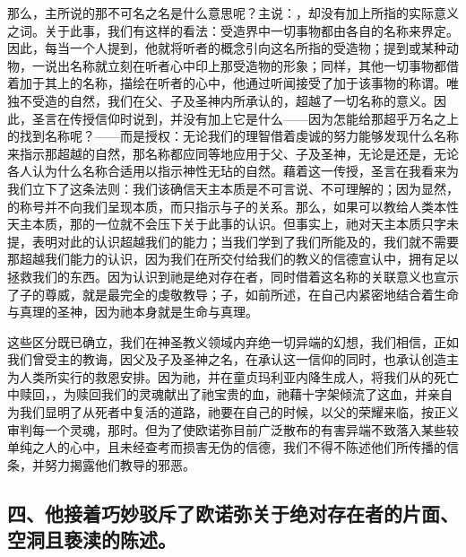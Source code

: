 那么，主所说的那不可名之名是什么意思呢？主说：，却没有加上所指的实际意义之词。关于此事，我们有这样的看法：受造界中一切事物都由各自的名称来界定。因此，每当一个人提到，他就将听者的概念引向这名所指的受造物；提到或某种动物，一说出名称就立刻在听者心中印上那受造物的形象；同样，其他一切事物都借着加于其上的名称，描绘在听者的心中，他通过听闻接受了加于该事物的称谓。唯独不受造的自然，我们在父、子及圣神内所承认的，超越了一切名称的意义。因此，圣言在传授信仰时说到，并没有加上它是什么——因为怎能给那超乎万名之上的找到名称呢？——而是授权：无论我们的理智借着虔诚的努力能够发现什么名称来指示那超越的自然，那名称都应同等地应用于父、子及圣神，无论是还是，无论各人认为什么名称合适用以指示神性无玷的自然。藉着这一传授，圣言在我看来为我们立下了这条法则：我们该确信天主本质是不可言说、不可理解的；因为显然，的称号并不向我们呈现本质，而只指示与子的关系。那么，如果可以教给人类本性天主本质，那的一位就不会压下关于此事的认识。但事实上，祂对天主本质只字未提，表明对此的认识超越我们的能力；当我们学到了我们所能及的，我们就不需要那超越我们能力的认识，因为我们在所交付给我们的教义的信德宣认中，拥有足以拯救我们的东西。因为认识到祂是绝对存在者，同时借着这名称的关联意义也宣示了子的尊威，就是最完全的虔敬教导；子，如前所述，在自己内紧密地结合着生命与真理的圣神，因为祂本身就是生命与真理。\par

这些区分既已确立，我们在神圣教义领域内弃绝一切异端的幻想，我们相信，正如我们曾受主的教诲，因父及子及圣神之名，在承认这一信仰的同时，也承认创造主为人类所实行的救恩安排。因为祂，并在童贞玛利亚内降生成人，将我们从的死亡中赎回，，为赎回我们的灵魂献出了祂宝贵的血，祂藉十字架倾流了这血，并亲自为我们显明了从死者中复活的道路，祂要在自己的时候，以父的荣耀来临，按正义审判每一个灵魂，那时。但为了使欧诺弥目前广泛散布的有害异端不致落入某些较单纯之人的心中，且未经查考而损害无伪的信德，我们不得不陈述他们所传播的信条，并努力揭露他们教导的邪恶。\par


\subsection{四、他接着巧妙驳斥了欧诺弥关于绝对存在者的片面、空洞且亵渎的陈述。}

